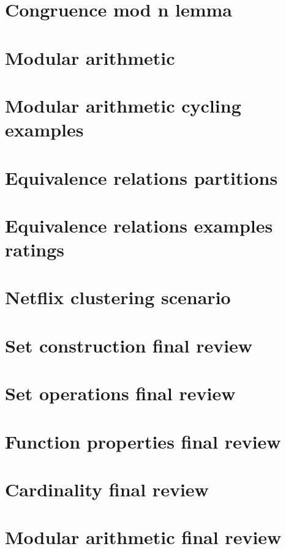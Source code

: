 \section*{Congruence mod n lemma}

\vfill
\section*{Modular arithmetic}

\vfill
\section*{Modular arithmetic cycling examples}

\vfill
\section*{Equivalence relations partitions}

\vfill
\section*{Equivalence relations examples ratings}

\vfill
\section*{Netflix clustering scenario}

\vfill
\section*{Set construction final review}

\vfill
\section*{Set operations final review}

\vfill
\section*{Function properties final review}

\vfill
\section*{Cardinality final review}

\vfill
\section*{Modular arithmetic final review}

\vfill
